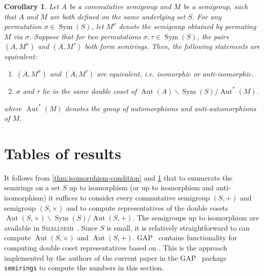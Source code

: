 \documentclass{article}
\theoremstyle{definition}
\theoremstyle{plain}
\newtheorem{cor}[defn]{Corollary}
\newcommand{\GAP}{\textsc{GAP}~\cite{GAP4}\xspace}
\newcommand{\Smallsemi}{\textsc{Smallsemi}~\cite{Smallsemi}\xspace}
\newcommand{\Sym}{\operatorname{Sym}}
\newcommand{\Aut}{\operatorname{Aut}}
\begin{document}

\begin{cor}
  \label{cor:equiv-condition}
  Let \(A\) be a commutative semigroup and \(M\) be a semigroup, such
  that \(A\) and \(M\) are both defined on the same underlying set
  \(S\). For any permutation \(\sigma \in \operatorname{Sym}(S)\),
  let \(M^\sigma\) denote the semigroup obtained by permuting \(M\)
  via \(\sigma\). Suppose that for two permutations \(\sigma,
  \tau\in\operatorname{Sym}(S)\), the pairs \((A,M^\sigma)\) and
  \((A,M^\tau)\) both form semirings. Then, the following statements
  are equivalent:
  \begin{enumerate}
    \item \((A, M^\sigma)\) and \((A, M^\tau)\) are equivalent, i.e.
      isomorphic or anti-isomorphic.
    \item \(\sigma\) and \(\tau\) lie in the same double coset of
      \(\operatorname{Aut}(A) \backslash \operatorname{Sym}(S) /
      \operatorname{Aut}^*(M)\).
  \end{enumerate}
  where \(\operatorname{Aut}^*(M)\) denotes the group of
  automorphisms and anti-automorphisms of \(M\).
\end{cor}

\section{Tables of results}

It follows from \cref{thm:isomorphism-condition} and
\cref{cor:equiv-condition} that to enumerate the
semirings on a set $S$ up to isomorphism (or up to isomorphism and
anti-isomorphism) it suffices to consider every
commutative semigroup $(S, +)$ and semigroup $(S, \times)$
and to compute representatives of the double cosets \(\Aut(S, \times)
\backslash \Sym(S) / \Aut(S, +)\). The semigroups up to isomorphism are
available in \Smallsemi.  Since $S$ is small, it is relatively
straightforward to can compute $\Aut(S, \times)$ and $\Aut(S, +)$.
\GAP contains functionality for computing double coset
representatives based on \cite{}. This is the approach implemented by the
authors of the current paper in the \GAP package \texttt{semirings} to compute
the numbers in this section.

\end{document}
